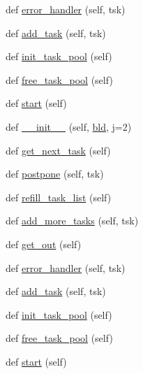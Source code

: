 \begin{DoxyCompactItemize}
\item 
def \hyperlink{classwaflib_1_1_runner_1_1_parallel_a5687053d52ada326ac8754dc15bd5138}{error\+\_\+handler} (self, tsk)
\item 
def \hyperlink{classwaflib_1_1_runner_1_1_parallel_a7b6dec41418a4eb5a39aa35756ef39c6}{add\+\_\+task} (self, tsk)
\item 
def \hyperlink{classwaflib_1_1_runner_1_1_parallel_a847fede29cb9dfe31b6b694e1044d100}{init\+\_\+task\+\_\+pool} (self)
\item 
def \hyperlink{classwaflib_1_1_runner_1_1_parallel_aed9785fdb3b1d54bbdc5520942ebe237}{free\+\_\+task\+\_\+pool} (self)
\item 
def \hyperlink{classwaflib_1_1_runner_1_1_parallel_a091adebadfabd759640c7347de4b05e2}{start} (self)
\item 
def \hyperlink{classwaflib_1_1_runner_1_1_parallel_a0c0a52852b556178d86233e354383f51}{\+\_\+\+\_\+init\+\_\+\+\_\+} (self, \hyperlink{classwaflib_1_1_runner_1_1_parallel_a710f2069db915f1b04538ed7989511ff}{bld}, j=2)
\item 
def \hyperlink{classwaflib_1_1_runner_1_1_parallel_a13620afd7fb0dac47215c1a434c3a79a}{get\+\_\+next\+\_\+task} (self)
\item 
def \hyperlink{classwaflib_1_1_runner_1_1_parallel_ab025fd073c2f52e72df1a3bc8d188d0e}{postpone} (self, tsk)
\item 
def \hyperlink{classwaflib_1_1_runner_1_1_parallel_a2f7785b4be91f45b53a9f294fb3a990e}{refill\+\_\+task\+\_\+list} (self)
\item 
def \hyperlink{classwaflib_1_1_runner_1_1_parallel_a7501769205be6d24343c054f46e43289}{add\+\_\+more\+\_\+tasks} (self, tsk)
\item 
def \hyperlink{classwaflib_1_1_runner_1_1_parallel_aa5803cc70ce58b6f1ed09d8e4414aeef}{get\+\_\+out} (self)
\item 
def \hyperlink{classwaflib_1_1_runner_1_1_parallel_a5687053d52ada326ac8754dc15bd5138}{error\+\_\+handler} (self, tsk)
\item 
def \hyperlink{classwaflib_1_1_runner_1_1_parallel_a7b6dec41418a4eb5a39aa35756ef39c6}{add\+\_\+task} (self, tsk)
\item 
def \hyperlink{classwaflib_1_1_runner_1_1_parallel_a847fede29cb9dfe31b6b694e1044d100}{init\+\_\+task\+\_\+pool} (self)
\item 
def \hyperlink{classwaflib_1_1_runner_1_1_parallel_aed9785fdb3b1d54bbdc5520942ebe237}{free\+\_\+task\+\_\+pool} (self)
\item 
def \hyperlink{classwaflib_1_1_runner_1_1_parallel_a091adebadfabd759640c7347de4b05e2}{start} (self)

\end{DoxyCompactItemize}
